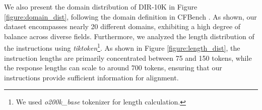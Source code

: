 We also present the domain distribution of DIR-10K in Figure \ref{figure:domain_dist}, following the domain definition in CFBench \citep{zhang2024cfbench}. As shown, our dataset encompasses nearly 20 different domains, exhibiting a high degree of balance across diverse fields. Furthermore, we analyzed the length distribution of the instructions using \textit{tiktoken}\footnote{We used \textit{o200k\_base} tokenizer for length calculation.}. As shown in Figure \ref{figure:length_dist}, the instruction lengths are primarily concentrated between 75 and 150 tokens, while the response lengths can scale to around 700 tokens, ensuring that our instructions provide sufficient information for alignment.